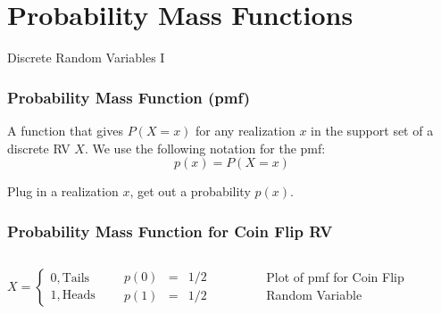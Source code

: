 \section{Probability Mass Functions}
\begin{frame}

\centering \Huge Discrete Random Variables I

\end{frame}
\begin{frame}
\frametitle{Probability Mass Function (pmf)}
 A function that gives $P(X=x)$ for any realization $x$ in the support set of a discrete RV $X$. We use the following notation for the pmf:
 $$p(x) = P(X =x)$$

 

\begin{alertblock}{Plug in a realization $x$, get out a probability  $p(x)$.}\end{alertblock}

 


\end{frame}
\begin{frame}
\frametitle{Probability Mass Function for Coin Flip RV}

\begin{columns}
$$X = \left\{ \begin{array}{l}  0, \mbox{Tails}\\ 1, \mbox{Heads}\end{array} \right.$$

\begin{eqnarray*}
	p(0) &=& 1/2\\
	p(1) &=& 1/2
\end{eqnarray*}


\begin{figure}
\centering
{}
\caption{Plot of pmf for Coin Flip Random Variable}
\end{figure}
\end{columns}


\end{frame}



